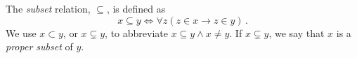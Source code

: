 \guard





\begin{defn}
\label{defn:subset}
  The \emph{subset} relation, $\subseteq$, is defined as \[ x\subseteq y\iff\forall z(z\in x\rightarrow z\in y)\,.\]
  We use $x\subset y$, or $x\subsetneq y$, to abbreviate $x\subseteq y\wedge x\not=y$.
  If $x\subsetneq y$, we say that $x$ is a \emph{proper subset} of $y$.
\end{defn}
